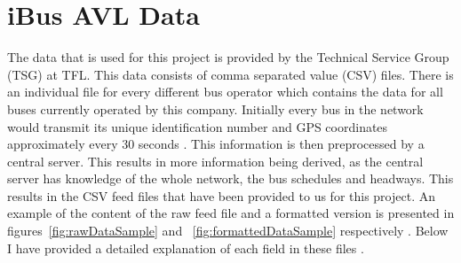 \section{iBus AVL Data}
The data that is used for this project is provided by the Technical Service Group (TSG) at TFL. This data consists of comma separated value (CSV) files. There is an individual file for every different bus operator which contains the data for all buses currently operated by this company. Initially every bus in the network would transmit its unique identification number and GPS coordinates approximately every 30 seconds \cite{Hounsell201276}. This information is then preprocessed by a central server. This results in more information being derived, as the central server has knowledge of the whole network, the bus schedules and headways. This results in the CSV feed files that have been provided to us for this project. An example of the content of the raw feed file and a formatted version is presented in figures~\ref{fig:rawDataSample} and ~\ref{fig:formattedDataSample} respectively . Below I have provided a detailed explanation of each field in these files \cite{infoBusesInservice}.
